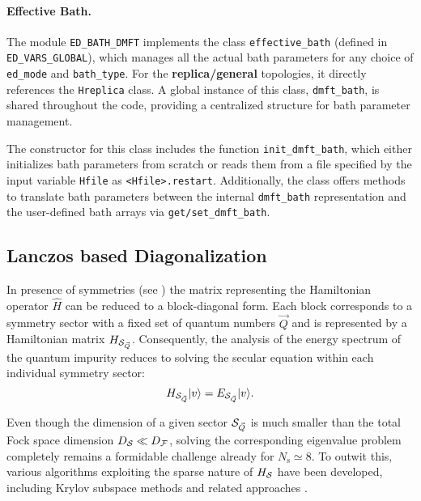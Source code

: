 \documentclass[edipack_sp.tex]{subfiles}
\begin{document}
\paragraph{Effective Bath.}
The module {\tt ED\_BATH\_DMFT} implements the class 
{\tt effective\_bath} (defined in {\tt ED\_VARS\_GLOBAL}), which 
manages all the actual bath parameters for any choice of 
{\tt ed\_mode} and {\tt bath\_type}. For the 
{\bf replica/general} topologies, it directly references the 
{\tt Hreplica} class. A global instance of this class, 
{\tt dmft\_bath}, is shared throughout the code, providing a 
centralized structure for bath parameter management.

The constructor for this class includes the function 
{\tt init\_dmft\_bath}, which either initializes bath parameters 
from scratch or reads them from a file specified by the input 
variable {\tt Hfile} as {\tt <Hfile>.restart}. Additionally, the class offers methods to 
translate bath parameters between the internal {\tt dmft\_bath} 
representation and the user-defined bath arrays via 
{\tt get/set\_dmft\_bath}.









\subsection{Lanczos based Diagonalization}\label{sSecHam}

In presence of symmetries (see ) the matrix representing
the Hamiltonian operator $\hat{H}$ can be reduced to a block-diagonal form. Each block corresponds to a symmetry sector
with a fixed set of quantum numbers $\vec{Q}$ and is represented by
a Hamiltonian matrix $H_{{\cal S}_{\vec{Q}}}$. 
Consequently, the analysis of the energy spectrum of the quantum impurity reduces to solving
the secular equation within each individual symmetry sector:
$$
H_{{\cal S}_{\vec{Q}}}|v\rangle=E_{{\cal S}_{\vec{Q}}}|v\rangle.
$$

Even though the dimension of a given sector ${\cal S}_{\vec{Q}}$ is much smaller than the
total Fock space dimension $D_{\cal S} \ll D_{\cal F}$, solving the
corresponding eigenvalue problem completely remains a formidable challenge
already for $N_\mathrm{s}\simeq 8$.
To outwit this, various
algorithms exploiting the sparse nature of
$H_{\cal S}$ have been developed, including Krylov subspace methods and related approaches
\cite{Lanczos1950JRNBSB,Lin1993CIP,Lehoucq1998,Maschhoff1996,Siro2012CPC,Siro2016CPC}.
\end{document}
